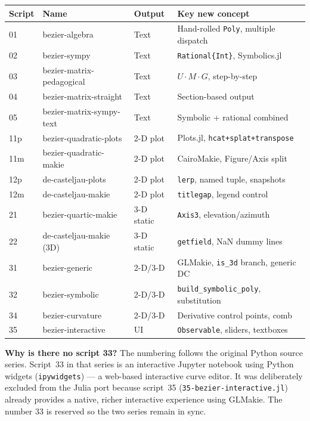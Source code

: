 \documentclass[12pt, a4paper]{article}
\newcommand{\cd}[1]{\texttt{#1}}
\begin{document}
\begin{center}
\renewcommand{\arraystretch}{1.2}
\begin{tabular}{lp{4.2cm}p{2.2cm}p{3.8cm}}
\toprule
Script & Name & Output & Key new concept \\
\midrule
\rowcolor{examplebg}
01 & bezier-algebra & Text & Hand-rolled \cd{Poly}, multiple dispatch \\
02 & bezier-sympy & Text & \cd{Rational\{Int\}}, Symbolics.jl \\
\rowcolor{examplebg}
03 & bezier-matrix-pedagogical & Text & $U \cdot M \cdot G$, step-by-step \\
04 & bezier-matrix-straight & Text & Section-based output \\
\rowcolor{examplebg}
05 & bezier-matrix-sympy-text & Text & Symbolic + rational combined \\
\midrule
11p & bezier-quadratic-plots & 2-D plot & Plots.jl, \cd{hcat+splat+transpose} \\
\rowcolor{examplebg}
11m & bezier-quadratic-makie & 2-D plot & CairoMakie, Figure/Axis split \\
12p & de-casteljau-plots & 2-D plot & \cd{lerp}, named tuple, snapshots \\
\rowcolor{examplebg}
12m & de-casteljau-makie & 2-D plot & \cd{titlegap}, legend control \\
\midrule
21 & bezier-quartic-makie & 3-D static & \cd{Axis3}, elevation/azimuth \\
\rowcolor{examplebg}
22 & de-casteljau-makie (3D) & 3-D static & \cd{getfield}, NaN dummy lines \\
\midrule
31 & bezier-generic & 2-D/3-D & GLMakie, \cd{is\_3d} branch, generic DC \\
\rowcolor{examplebg}
32 & bezier-symbolic & 2-D/3-D & \cd{build\_symbolic\_poly}, substitution \\
34 & bezier-curvature & 2-D/3-D & Derivative control points, comb \\
\rowcolor{examplebg}
35 & bezier-interactive & UI & \cd{Observable}, sliders, textboxes \\
\bottomrule
\end{tabular}
\end{center}

\begin{notebox}
\textbf{Why is there no script 33?}
The numbering follows the original Python source series.
Script~33 in that series is an interactive Jupyter notebook
using Python widgets (\cd{ipywidgets}) --- a web-based
interactive curve editor.
It was deliberately excluded from the Julia port because
script~35 (\cd{35-bezier-interactive.jl}) already provides
a native, richer interactive experience using GLMakie.
The number 33 is reserved so the two series remain
in sync.
\end{notebox}
\end{document}
